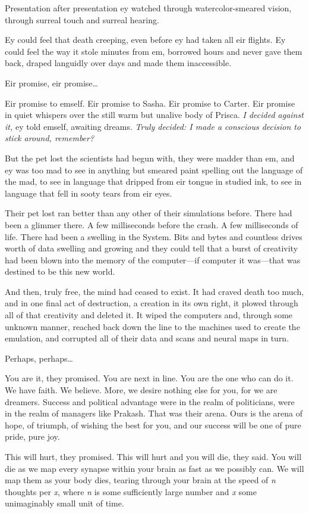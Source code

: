 Presentation after presentation ey watched through watercolor-smeared vision, through surreal touch and surreal hearing.

Ey could feel that death creeping, even before ey had taken all eir flights. Ey could feel the way it stole minutes from em, borrowed hours and never gave them back, draped languidly over days and made them inaccessible.

Eir promise, eir promise\ldots{}

Eir promise to emself. Eir promise to Sasha. Eir promise to Carter. Eir promise in quiet whispers over the still warm but unalive body of Prisca. \emph{I decided against it,} ey told emself, awaiting dreams. \emph{Truly decided: I made a conscious decision to stick around, remember?}

But the pet lost the scientists had begun with, they were madder than em, and ey was too mad to see in anything but smeared paint spelling out the language of the mad, to see in language that dripped from eir tongue in studied ink, to see in language that fell in sooty tears from eir eyes.

Their pet lost ran better than any other of their simulations before. There had been a glimmer there. A few milliseconds before the crash. A few milliseconds of life. There had been a swelling in the System. Bits and bytes and countless drives worth of data swelling and growing and they could tell that a burst of creativity had been blown into the memory of the computer—if computer it was—that was destined to be this new world.

And then, truly free, the mind had ceased to exist. It had craved death too much, and in one final act of destruction, a creation in its own right, it plowed through all of that creativity and deleted it. It wiped the computers and, through some unknown manner, reached back down the line to the machines used to create the emulation, and corrupted all of their data and scans and neural maps in turn.

Perhaps, perhaps\ldots

You are it, they promised. You are next in line. You are the one who can do it. We have faith. We believe. More, we desire nothing else for you, for we are dreamers. Success and political advantage were in the realm of politicians, were in the realm of managers like Prakash. That was their arena. Ours is the arena of hope, of triumph, of wishing the best for you, and our success will be one of pure pride, pure joy.

This will hurt, they promised. This will hurt and you will die, they said. You will die as we map every synapse within your brain as fast as we possibly can. We will map them as your body dies, tearing through your brain at the speed of \emph{n} thoughts per \emph{x}, where \emph{n} is some sufficiently large number and \emph{x} some unimaginably small unit of time.

